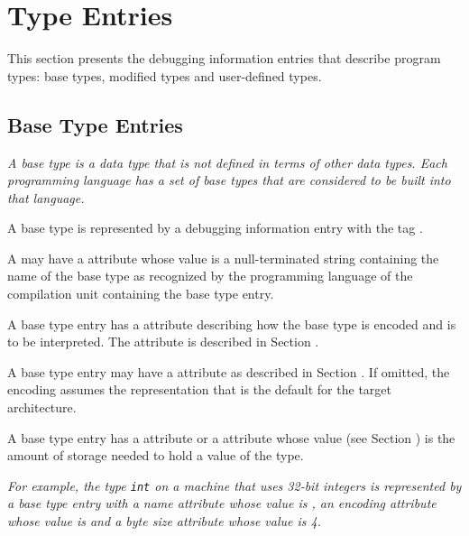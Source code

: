 \chapter{Type Entries}
\label{chap:typeentries}
This section presents the debugging information entries
that describe program types: base types, modified types and
user-defined types.

\bbpareb

\section{Base Type Entries}
\label{chap:basetypeentries}

\textit{A base type is a data type that is not defined in terms of
other data types. 
Each programming language has a set of base
types that are considered to be built into that language.}

A base type is represented by a debugging information entry
with the tag \DWTAGbasetypeTARG.

A 
may have a \DWATname{} attribute
whose value is
a null-terminated string containing the name of the base type
as recognized by the programming language of the compilation
unit containing the base type entry.

A base type entry has 
a \DWATencoding{} attribute describing
how the base type is encoded and is to be interpreted. 
The \DWATencoding{} attribute is described in
Section .

A base type entry
may have a \DWATendianity{} attribute
as described in 
Section . 
If omitted, the encoding assumes the representation that
is the default for the target architecture.

A base type entry has a
\bbeb
{}
\DWATbytesize{}\hypertarget{chap:DWATbytesizedataobjectordatatypesize}{}
attribute or a
\DWATbitsize{}\hypertarget{chap:DWATbitsizebasetypebitsize}{} 
attribute whose  value
(see Section ) 
is the amount of storage needed to hold a value of the type.

\textit{For example, the 
 type \texttt{int} on a machine that uses 32-bit
integers is represented by a base type entry with a name
attribute whose value is , an encoding attribute
whose value is \DWATEsigned{}
and a byte size attribute whose value is 4.}


